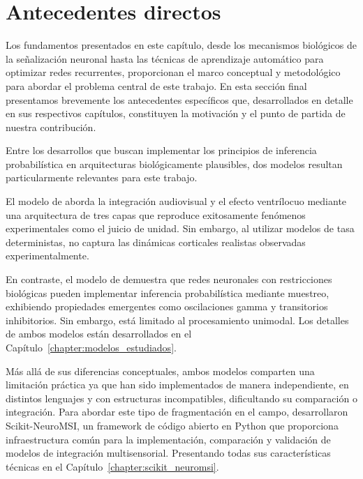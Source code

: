 \section{Antecedentes directos}
\label{subsec:antecedentes_directos}

Los fundamentos presentados en este capítulo, desde los mecanismos biológicos de la señalización neuronal hasta las técnicas de aprendizaje automático para optimizar redes recurrentes, proporcionan el marco conceptual y metodológico para abordar el problema central de este trabajo. En esta sección final presentamos brevemente los antecedentes específicos que, desarrollados en detalle en sus respectivos capítulos, constituyen la motivación y el punto de partida de nuestra contribución.

Entre los desarrollos que buscan implementar los principios de inferencia probabilística en arquitecturas biológicamente plausibles, dos modelos resultan particularmente relevantes para este trabajo.

El modelo de \citet{cuppini2017biologically} aborda la integración audiovisual y el efecto ventrílocuo mediante una arquitectura de tres capas que reproduce exitosamente fenómenos experimentales como el juicio de unidad. Sin embargo, al utilizar modelos de tasa deterministas, no captura las dinámicas corticales realistas observadas experimentalmente. 

En contraste, el modelo de \citet{echeveste2020cortical} demuestra que redes neuronales con restricciones biológicas pueden implementar inferencia probabilística mediante muestreo, exhibiendo propiedades emergentes como oscilaciones gamma y transitorios inhibitorios. Sin embargo, está limitado al procesamiento unimodal. Los detalles de ambos modelos están desarrollados en el Capítulo~\ref{chapter:modelos_estudiados}.

Más allá de sus diferencias conceptuales, ambos modelos comparten una limitación práctica ya que han sido implementados de manera independiente, en distintos lenguajes y con estructuras incompatibles, dificultando su comparación o integración. Para abordar este tipo de fragmentación en el campo, \citet{paredes2025scikit} desarrollaron Scikit-NeuroMSI, un framework de código abierto en Python que proporciona infraestructura común para la implementación, comparación y validación de modelos de integración multisensorial. Presentando todas sus características técnicas en el Capítulo~\ref{chapter:scikit_neuromsi}.


